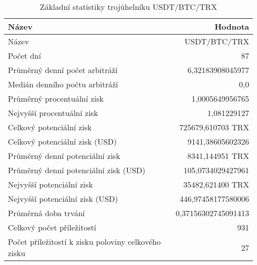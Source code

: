 \begin{table}\centering
\caption{Základní statistiky trojúhelníku USDT/BTC/TRX}
\label{USDTBTCTRX_stats}
\begin{tabular}{|| l | r ||}
\hline Název & Hodnota \\ 
\hline\hline Název & USDT/BTC/TRX \\ 
\hline Počet dní & 87 \\ 
\hline Průměrný denní počet arbitráží & 6,32183908045977 \\ 
\hline Medián denního počtu arbitráží & 0,0 \\ 
\hline Průměrný procentuální zisk & 1,0005649956765 \\ 
\hline Nejvyšší procentuální zisk & 1,081229127 \\ 
\hline Celkový potenciální zisk & 725679,610703 TRX \\ 
\hline Celkový potenciální zisk (USD) & 9141,38605602326 \\ 
\hline Průměrný denní potenciální zisk & 8341,144951 TRX \\ 
\hline Průměrný denní potenciální zisk (USD) & 105,0734029427961 \\ 
\hline Nejvyšší potenciální zisk & 35482,621400 TRX \\ 
\hline Nejvyšší potenciální zisk (USD) & 446,97458177580006 \\ 
\hline Průměrná doba trvání & 0,37156302745091413 \\ 
\hline Celkový počet příležitostí & 931 \\ 
\hline Počet příležitostí k zisku poloviny celkového zisku & 27 \\ 
\hline
\end{tabular}
\end{table}